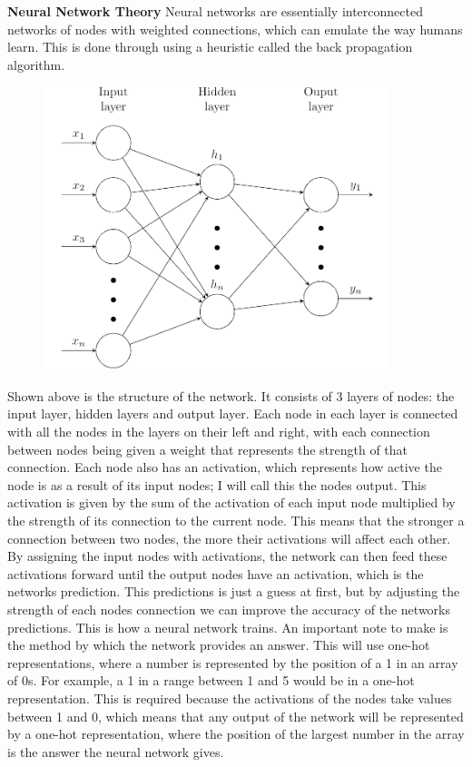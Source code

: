\documentclass{report}
\begin{document}
\textbf{Neural Network Theory}
\newline
Neural networks are essentially interconnected networks of nodes with weighted connections, which can emulate the way humans learn. This is done through using a heuristic called the back propagation algorithm.
\begin{figure}[H]
    \centering
    \includegraphics[width=10cm]{NeuralNetworkStructure.png}
    \label{fig:Network Structure}
\end{figure}
\noindent Shown above is the structure of the network. It consists of 3 layers of nodes: the input layer, hidden layers and output layer. Each node in each layer is connected with all the nodes in the layers on their left and right, with each connection between nodes being given a weight that represents the strength of that connection. Each node also has an activation, which represents how active the node is as a result of its input nodes; I will call this the nodes output. This activation is given by the sum of the activation of each input node multiplied by the strength of its connection to the current node. This means that the stronger a connection between two nodes, the more their activations will affect each other.
\newline
By assigning the input nodes with activations, the network can then feed these activations forward until the output nodes have an activation, which is the networks prediction. This predictions is just a guess at first, but by adjusting the strength of each nodes connection we can improve the accuracy of the networks predictions. This is how a neural network trains.
\newline
\newline
An important note to make is the method by which the network provides an answer. This will use one-hot representations, where a number is represented by the position of a 1 in an array of 0s. For example, a 1 in a range between 1 and 5 would be \pyth{[1, 0, 0, 0, 0]} in a one-hot representation. This is required because the activations of the nodes take values between 1 and 0, which means that any output of the network will be represented by a one-hot representation, where the position of the largest number in the array is the answer the neural network gives.
\end{document}
